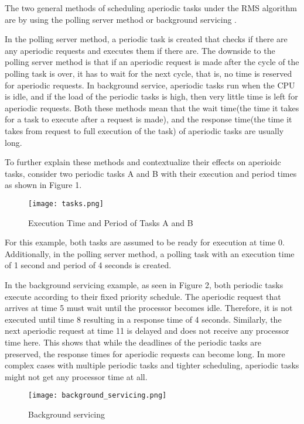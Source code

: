 \documentclass[conference]{IEEEtran}
\begin{document}
The two general methods of scheduling aperiodic tasks under the RMS algorithm are by using the polling server method or background servicing \cite{sprunt1990aperiodic}. 

In the polling server method, a periodic task is created that checks if there are any aperiodic requests and executes them if there are. The downside to the polling server method is that if an aperiodic request is made after the cycle of the polling task is over, it has to wait for the next cycle, that is, no time is reserved for aperiodic requests. In background service, aperiodic tasks run when the CPU is idle, and if the load of the periodic tasks is high, then very little time is left for aperiodic requests. Both these methods mean that the wait time(the time it takes for a task to execute after a request is made), and the response time(the time it takes from request to full execution of the task) of aperiodic tasks are usually long.


To further explain these methods and contextualize their effects on aperioidc tasks, consider two periodic tasks A and B with their execution and period times as shown in Figure 1. 

\begin{figure}[H]
  \centering
  \texttt{[image: tasks.png]} %
  \caption{Execution Time and Period of Tasks A and B}
\end{figure}

For this example, both tasks are assumed to be ready for execution at time 0. Additionally, in the polling server method, a polling task with an execution time of 1 second and period of 4 seconds is created. 

In the background servicing example, as seen in Figure 2, both periodic tasks execute according to their fixed priority schedule. The aperiodic request that arrives at time 5 must wait until the processor becomes idle. Therefore, it is not executed until time 8 resulting in a response time of 4 seconds. Similarly, the next aperiodic request at time 11 is delayed and does not receive any processor time here. 
This shows that while the deadlines of the periodic tasks are preserved, the response times for aperiodic requests  can become long. In more complex cases with multiple periodic tasks and tighter scheduling, aperiodic tasks might not get any processor time at all.
\begin{figure}[H]
    \centering
    \texttt{[image: background\_servicing.png]}
    \caption{Background servicing}
    \label{fig:polling}
\end{figure}
\end{document}

